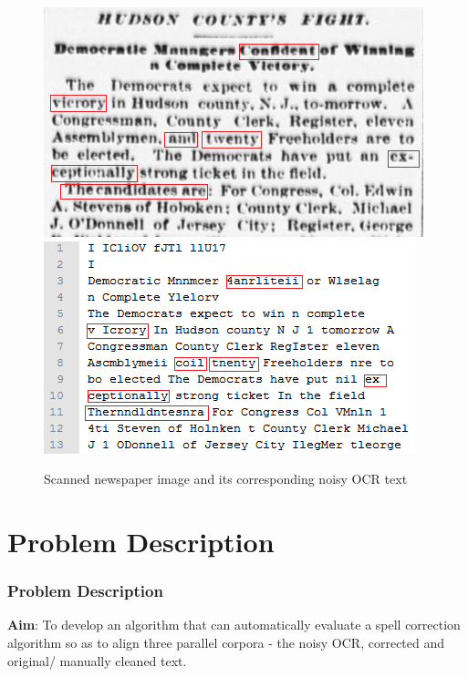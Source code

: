\documentclass{beamer}
\begin{document}
\begin{frame}
\begin{figure}[ht]
\begin{center}
\includegraphics[scale=0.5]{images/originalimage}
\includegraphics[scale=0.5]{images/ocr}
\caption{Scanned newspaper image and its corresponding noisy OCR text}
\end{center}
\end{figure}
\end{frame}

\section{Problem Description}
\begin{frame}
\frametitle{Problem Description}
 \justifying

\textbf{Aim}: To develop an algorithm that can
automatically evaluate a spell correction algorithm so as to align three parallel corpora - the
noisy OCR, corrected and original/ manually cleaned text.



\end{frame}




\end{document}
